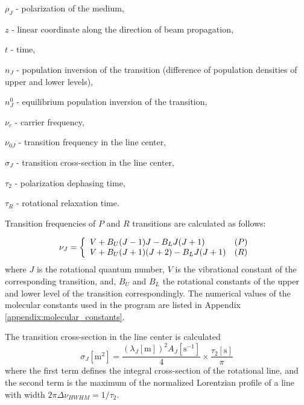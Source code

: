 \documentclass{report}
\begin{document}
$\rho_J$ - polarization of the medium,

$z$ - linear coordinate along the direction of beam propagation,

$t$ - time,

$n_J$ - population inversion of the transition (difference of population densities of upper and lower levels),

$n_J^0$ - equilibrium population inversion of the transition,

$\nu _c$ - carrier frequency,

$\nu_{0J}$ - transition frequency in the line center,

$\sigma_J$ - transition cross-section in the line center,

$\tau_2$ - polarization dephasing time,

$\tau_R$ - rotational relaxation time.

Transition frequencies of $P$ and $R$ transitions are calculated as follows:

\begin{equation}\label{eq:frequencies}
\nu_J = \left\{ \begin{array}{ll}
  V + B_U (J-1)J     - B_L J (J+1) & (P)\\
  V + B_U (J+1)(J+2) - B_L J (J+1) & (R)\end{array}\right.\\ 
\end{equation}
where $J$ is the rotational quantum number, $V$ is the vibrational constant of the corresponding transition, and, $B_U$ and $B_L$ the rotational constants of the upper and lower level of the transition correspondingly. The numerical values of the molecular constants used in the program are listed in Appendix \ref{appendix:molecular_constants}.

The transition cross-section in the line center is calculated \cite{Hilborn-2002}
\begin{equation}\label{eq:sigma}
{\sigma _J}[\text{m}^2] = \frac{(\lambda _J[\text{m}])^2 A_J[\text{s}^{-1}]}{4} \times \frac{\tau_2[\text{s}]}{\pi}
\end{equation}
where the first term defines the integral cross-section of the rotational line, and the second term is the maximum of the normalized Lorentzian profile of a line with width $2\pi\Delta\nu _{HWHM}=1/\tau_2$.
\end{document}
